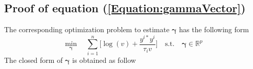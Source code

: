 \vspace{-0.9cm}
\subsection{Proof of equation (\ref{Equation:gammaVector}) } %
\noindent
The corresponding optimization problem to estimate $\boldsymbol{\gamma}$ has the following form 
\vspace{-0.1cm}
\begin{equation*}
    \min_{\boldsymbol{\gamma}} \quad \sum_{i=1}^n \Bigg[ \log\left( v \right) + \frac{y^{i*} y^i}{\tau_i v} \Bigg]  %
    \quad  \text{s.t.} \quad  \boldsymbol{\gamma}  \in \mathbb{R}^p
\end{equation*}
\vspace{-0.3cm}
The closed form of $\boldsymbol{\gamma}$ is obtained as follow
